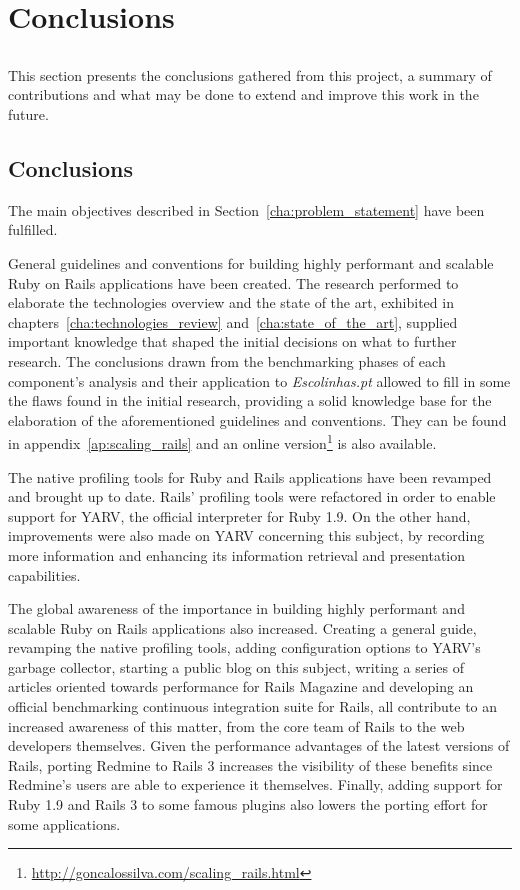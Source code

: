 \chapter{Conclusions} %
\label{cha:conclusions}
\section*{} %
This section presents the conclusions gathered from this project, a summary of contributions and what may be done to extend and improve this work in the future.

\section{Conclusions}
The main objectives described in Section~\ref{cha:problem_statement} have been fulfilled.

General guidelines and conventions for building highly performant and scalable Ruby on Rails applications have been created. The research performed to elaborate the technologies overview and the state of the art, exhibited in chapters~\ref{cha:technologies_review} and~\ref{cha:state_of_the_art}, supplied important knowledge that shaped the initial decisions on what to further research. The conclusions drawn from the benchmarking phases of each component's analysis and their application to \textit{Escolinhas.pt} allowed to fill in some the flaws found in the initial research, providing a solid knowledge base for the elaboration of the aforementioned guidelines and conventions. They can be found in appendix~\ref{ap:scaling_rails} and an online version\footnote{\url{http://goncalossilva.com/scaling_rails.html}} is also available.

The native profiling tools for Ruby and Rails applications have been revamped and brought up to date. Rails' profiling tools were refactored in order to enable support for YARV, the official interpreter for Ruby 1.9. On the other hand, improvements were also made on YARV concerning this subject, by recording more information and enhancing its information retrieval and presentation capabilities.

The global awareness of the importance in building highly performant and scalable Ruby on Rails applications also increased. Creating a general guide, revamping the native profiling tools, adding configuration options to YARV's garbage collector, starting a public blog on this subject, writing a series of articles oriented towards performance for Rails Magazine and developing an official benchmarking continuous integration suite for Rails, all contribute to an increased awareness of this matter, from the core team of Rails to the web developers themselves. Given the performance advantages of the latest versions of Rails, porting Redmine to Rails 3 increases the visibility of these benefits since Redmine's users are able to experience it themselves. Finally, adding support for Ruby 1.9 and Rails 3 to some famous plugins also lowers the porting effort for some applications.

